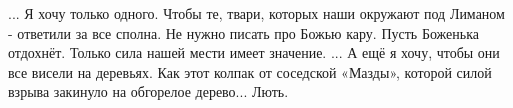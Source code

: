 
\obeycr
...
Я хочу только одного.
Чтобы те, твари, которых наши окружают под Лиманом - ответили за все сполна.
Не нужно писать про Божью кару.
Пусть Боженька отдохнёт.
Только сила нашей мести имеет значение.
...
А ещё я хочу, чтобы они все висели на деревьях.
Как этот колпак от соседской «Мазды», которой силой взрыва закинуло на обгорелое дерево...
Лють.
\restorecr


